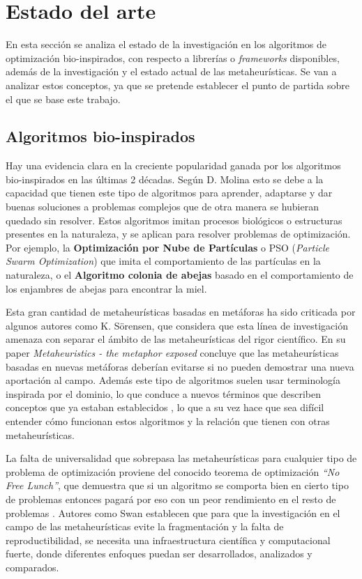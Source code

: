 \chapter{Estado del arte}

En esta sección se analiza el estado de la investigación en los algoritmos de optimización bio-inspirados, con respecto a 
librerías o \emph{frameworks} disponibles, además de la investigación y el estado actual de las metaheurísticas. Se van a analizar
estos conceptos, ya que se pretende establecer el punto de partida sobre el que se base este trabajo.

\section{Algoritmos bio-inspirados}

Hay una evidencia clara en la creciente popularidad ganada por los algoritmos bio-inspirados en las últimas 2 décadas. Según D. Molina \cite{Molina2020ComprehensiveTO} esto se
debe a la capacidad que tienen este tipo de algoritmos para aprender, adaptarse y dar buenas soluciones a problemas complejos que de otra manera se hubieran quedado sin
resolver. Estos algoritmos imitan procesos biológicos o estructuras presentes en la naturaleza, y se aplican para resolver problemas de optimización. Por ejemplo, 
la \textbf{Optimización por Nube de Partículas} o PSO (\textit{Particle Swarm Optimization}) que imita el comportamiento de las partículas en la naturaleza, o 
el \textbf{Algoritmo colonia de abejas} basado en el comportamiento de los enjambres de abejas para encontrar la miel. 

Esta gran cantidad de metaheurísticas basadas en metáforas ha sido criticada por algunos autores como K. Sörensen\cite{metaphor_exposed}, 
que considera que esta línea de investigación amenaza con separar el ámbito de las metaheurísticas del rigor científico. 
En su paper \emph{Metaheuristics - the metaphor exposed} concluye que las metaheurísticas basadas en nuevas metáforas deberían 
evitarse si no pueden demostrar una nueva aportación al campo. Además este tipo de algoritmos suelen usar terminología inspirada por el dominio, 
lo que conduce a nuevos términos que describen conceptos que ya estaban establecidos \cite{mitigating_metaphors}, lo que a su vez hace que sea difícil 
entender cómo funcionan estos algoritmos y la relación que tienen con otras metaheurísticas. 

La falta de universalidad que sobrepasa las metaheurísticas para cualquier tipo de problema de optimización proviene
del conocido teorema de optimización \emph{``No Free Lunch''}, que demuestra que si un algoritmo se comporta bien en cierto tipo de 
problemas entonces pagará por eso con un peor rendimiento en el resto de problemas \cite{585893}. Autores como 
Swan \cite{metaheuristics} establecen que para que la investigación en el campo de las metaheurísticas evite la fragmentación y la falta de reproductibilidad, se 
necesita una infraestructura científica y computacional fuerte, donde diferentes enfoques puedan ser desarrollados, analizados y comparados. 

